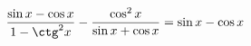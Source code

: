\begin{ex}[type=prove_identity]
	\begin{condition}
		\( \dfrac{\sin x-\cos x}{1-\ctg^2x}-\dfrac{\cos^2x}{\sin x+\cos x}=\sin x-\cos x \)
	\end{condition}
\end{ex}
